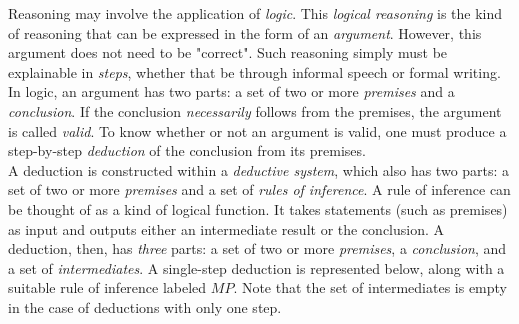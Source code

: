 Reasoning may involve the application of \textit{logic}. This \textit{logical reasoning} is the kind of reasoning that can be expressed in the form of an \textit{argument}. However, this argument does not need to be "correct". Such reasoning simply must be explainable in \textit{steps}, whether that be through informal speech or formal writing. \\

In logic, an argument has two parts: a set of two or more \textit{premises} and a \textit{conclusion}. If the conclusion \textit{necessarily} follows from the premises, the argument is called \textit{valid}. To know whether or not an argument is valid, one must produce a step-by-step \textit{deduction} of the conclusion from its premises. \\

A deduction is constructed within a \textit{deductive system}, which also has two parts: a set of two or more \textit{premises} and a set of \textit{rules of inference}. A rule of inference can be thought of as a kind of logical function. It takes statements (such as premises) as input and outputs either an intermediate result or the conclusion. A deduction, then, has \textit{three} parts: a set of two or more \textit{premises}, a \textit{conclusion}, and a set of \textit{intermediates}. A single-step deduction is represented below, along with a suitable rule of inference labeled $MP$. Note that the set of intermediates is empty in the case of deductions with only one step. \\[2mm]

